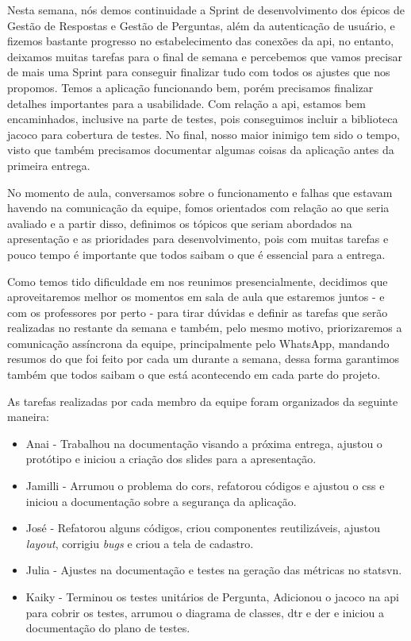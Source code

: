 Nesta semana, nós demos continuidade a \gls{Sprint} de desenvolvimento dos épicos de Gestão de Respostas e Gestão de Perguntas, além da autenticação de usuário, e fizemos bastante progresso no estabelecimento das conexões da \acs{api}, no entanto, deixamos muitas tarefas para o final de semana e percebemos que vamos precisar de mais uma \gls{Sprint} para conseguir finalizar tudo com todos os ajustes que nos propomos. Temos a aplicação funcionando bem, porém precisamos finalizar detalhes importantes para a usabilidade. Com relação a \acs{api}, estamos bem encaminhados, inclusive na parte de testes, pois conseguimos incluir a biblioteca \acs{jacoco} para cobertura de testes. No final, nosso maior inimigo tem sido o tempo, visto que também precisamos documentar algumas coisas da aplicação antes da primeira entrega.

No momento de aula, conversamos sobre o funcionamento e falhas que estavam havendo na comunicação da equipe, fomos orientados com relação ao que seria avaliado e a partir disso, definimos os tópicos que seriam abordados na apresentação e as prioridades para desenvolvimento, pois com muitas tarefas e pouco tempo é importante que todos saibam o que é essencial para a entrega.

Como temos tido dificuldade em nos reunimos presencialmente, decidimos que aproveitaremos melhor os momentos em sala de aula que estaremos juntos - e com os professores por perto - para tirar dúvidas e definir as tarefas que serão realizadas no restante da semana e também, pelo mesmo motivo, priorizaremos a comunicação assíncrona da equipe, principalmente pelo \gls{WhatsApp}, mandando resumos do que foi feito por cada um durante a semana, dessa forma garantimos também que todos saibam o que está acontecendo em cada parte do projeto.

As tarefas realizadas por cada membro da equipe foram organizados da seguinte maneira:
\begin{itemize}
    \item Anai - Trabalhou na documentação visando a próxima entrega, ajustou o protótipo e iniciou a criação dos slides para a apresentação. 
    \item Jamilli - Arrumou o problema do \acs{cors}, refatorou códigos e ajustou o \acs{css} e iniciou a documentação sobre a segurança da aplicação.
    \item José - Refatorou alguns códigos, criou componentes reutilizáveis, ajustou \textit{layout}, corrigiu \textit{bugs} e criou a tela de cadastro.
    \item Julia - Ajustes na documentação e testes na geração das métricas no \gls{statsvn}.
    \item Kaiky - Terminou os testes unitários de Pergunta, Adicionou o \acs{jacoco} na \acs{api} para cobrir os testes, arrumou o diagrama de classes, \acs{dtr} e \acs{der} e iniciou a documentação do plano de testes.
\end{itemize}

